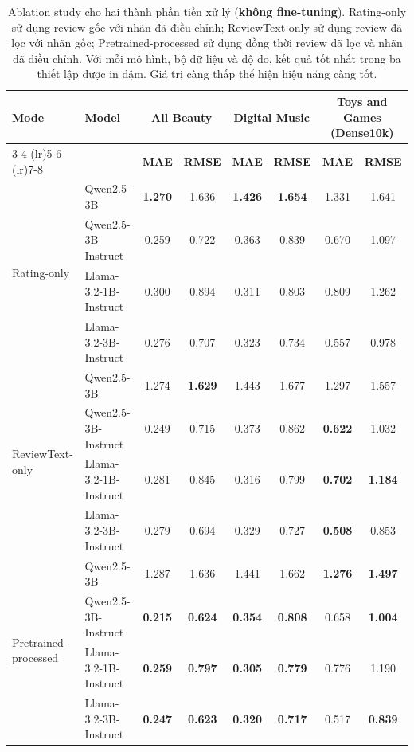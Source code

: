 \begin{table}
\centering
\caption{Ablation study cho hai thành phần tiền xử lý (\textbf{không fine-tuning}). Rating-only sử dụng review gốc với nhãn đã điều chỉnh; ReviewText-only sử dụng review đã lọc với nhãn gốc; Pretrained-processed sử dụng đồng thời review đã lọc và nhãn đã điều chỉnh. Với mỗi mô hình, bộ dữ liệu và độ đo, kết quả tốt nhất trong ba thiết lập được in đậm. Giá trị càng thấp thể hiện hiệu năng càng tốt.}
\label{tab:llm-preprocessing-ablation-dense10k}
\begin{tabular}{llcc|cc|cc}
\toprule
\multirow{2}{*}{\textbf{Mode}}
& \multirow{2}{*}{\textbf{Model}}
& \multicolumn{2}{c|}{\textbf{All Beauty}}
& \multicolumn{2}{c|}{\textbf{Digital Music}}
& \multicolumn{2}{c}{\textbf{Toys and Games (Dense10k)}} \\
\cmidrule(lr){3-4} \cmidrule(lr){5-6} \cmidrule(lr){7-8}
& & \textbf{MAE} & \textbf{RMSE}
  & \textbf{MAE} & \textbf{RMSE}
  & \textbf{MAE} & \textbf{RMSE} \\
\midrule

\multirow{4}{*}{Rating-only}
& Qwen2.5-3B
  & \textbf{1.270} & 1.636
  & \textbf{1.426} & \textbf{1.654}
  & 1.331 & 1.641 \\
& Qwen2.5-3B-Instruct
  & 0.259 & 0.722
  & 0.363 & 0.839
  & 0.670 & 1.097 \\
& Llama-3.2-1B-Instruct
  & 0.300 & 0.894
  & 0.311 & 0.803
  & 0.809 & 1.262 \\
& Llama-3.2-3B-Instruct
  & 0.276 & 0.707
  & 0.323 & 0.734
  & 0.557 & 0.978 \\
\midrule

\multirow{4}{*}{ReviewText-only}
& Qwen2.5-3B
  & 1.274 & \textbf{1.629}
  & 1.443 & 1.677
  & 1.297 & 1.557 \\
& Qwen2.5-3B-Instruct
  & 0.249 & 0.715
  & 0.373 & 0.862
  & \textbf{0.622} & 1.032 \\
& Llama-3.2-1B-Instruct
  & 0.281 & 0.845
  & 0.316 & 0.799
  & \textbf{0.702} & \textbf{1.184} \\
& Llama-3.2-3B-Instruct
  & 0.279 & 0.694
  & 0.329 & 0.727
  & \textbf{0.508} & 0.853 \\
\midrule

\multirow{4}{*}{Pretrained-processed}
& Qwen2.5-3B
  & 1.287 & 1.636
  & 1.441 & 1.662
  & \textbf{1.276} & \textbf{1.497} \\
& Qwen2.5-3B-Instruct
  & \textbf{0.215} & \textbf{0.624}
  & \textbf{0.354} & \textbf{0.808}
  & 0.658 & \textbf{1.004} \\
& Llama-3.2-1B-Instruct
  & \textbf{0.259} & \textbf{0.797}
  & \textbf{0.305} & \textbf{0.779}
  & 0.776 & 1.190 \\
& Llama-3.2-3B-Instruct
  & \textbf{0.247} & \textbf{0.623}
  & \textbf{0.320} & \textbf{0.717}
  & 0.517 & \textbf{0.839} \\
\bottomrule
\end{tabular}
\end{table}
